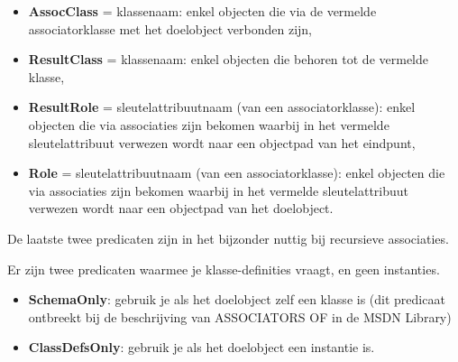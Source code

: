 \documentclass[11pt,a4paper]{report}
\begin{document}
\begin{itemize}
\item \textbf{AssocClass} = klassenaam: enkel objecten die via de vermelde associatorklasse met het doelobject verbonden zijn,
\item \textbf{ResultClass} = klassenaam: enkel objecten die behoren tot de vermelde klasse,
\item \textbf{ResultRole} = sleutelattribuutnaam (van een associatorklasse): enkel objecten die via associaties zijn bekomen waarbij in het vermelde sleutelattribuut verwezen wordt naar een objectpad van het eindpunt,
\item \textbf{Role} = sleutelattribuutnaam (van een associatorklasse): enkel objecten die via associaties zijn bekomen waarbij in het vermelde sleutelattribuut verwezen wordt naar een objectpad van het doelobject.
\end{itemize}
De laatste twee predicaten zijn in het bijzonder nuttig bij recursieve associaties.
\par Er zijn twee predicaten waarmee je klasse-definities vraagt, en geen instanties.
\begin{itemize}
\item \textbf{SchemaOnly}: gebruik je als het doelobject zelf een klasse is (dit predicaat ontbreekt bij de beschrijving van ASSOCIATORS OF in de MSDN Library)
\item \textbf{ClassDefsOnly}: gebruik je als het doelobject een instantie is.
\end{itemize} 
\end{document}
